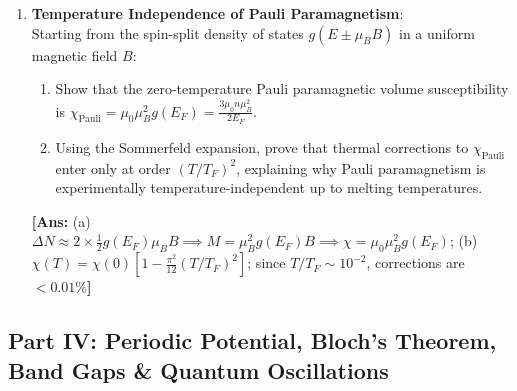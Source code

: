 \documentclass[11pt,a4paper]{article}
\begin{document}
\begin{enumerate}[label=\textbf{\arabic*.}, resume, leftmargin=*]
    \item \textbf{Temperature Independence of Pauli Paramagnetism}:\\
    Starting from the spin-split density of states $g(E \pm \mu_B B)$ in a uniform magnetic field $B$:
    \begin{enumerate}[label=(\alph*)]
        \item Show that the zero-temperature Pauli paramagnetic volume susceptibility is $\chi_{\mathrm{Pauli}} = \mu_0 \mu_B^2 g(E_F) = \frac{3\mu_0 n \mu_B^2}{2E_F}$.
        \item Using the Sommerfeld expansion, prove that thermal corrections to $\chi_{\mathrm{Pauli}}$ enter only at order $(T/T_F)^2$, explaining why Pauli paramagnetism is experimentally temperature-independent up to melting temperatures.
    \end{enumerate}
    \textbf{[Ans:} (a) $\Delta N \approx 2 \times \frac{1}{2}g(E_F)\mu_B B \implies M = \mu_B^2 g(E_F)B \implies \chi = \mu_0\mu_B^2 g(E_F)$; (b) $\chi(T) = \chi(0)[1 - \frac{\pi^2}{12}(T/T_F)^2]$; since $T/T_F \sim 10^{-2}$, corrections are $< 0.01\%$\textbf{]}
\end{enumerate}

\vspace{0.4cm}

\subsection*{Part IV: Periodic Potential, Bloch's Theorem, Band Gaps \& Quantum Oscillations}
\end{document}

